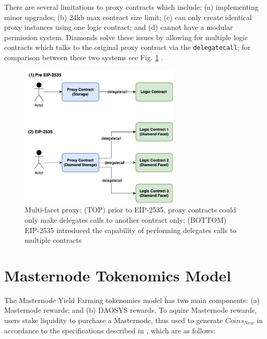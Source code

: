 \documentclass[journal,twocolumn,12pt]{ieeesyscoin}
\begin{document}
There are several limitations to proxy contracts which include: (a) implementing minor upgrades; (b) 24kb max contract size limit; (c) can only create identical proxy instances using one logic contract; and (d) cannot have a modular permission system. Diamonds solve these issues by allowing for multiple logic contracts which talks to the original proxy contract via the \texttt{delegatecall}; for comparison between these two systems see Fig. \ref{fig:diamonds} .

\begin{figure}[h!]
\includegraphics[width=3in]{img/diamonds.png}
\caption{Multi-facet proxy; (TOP) prior to EIP-2535, proxy contracts could only make delegates calls to another contract only; (BOTTOM) EIP-2535 introduced the capability of performing delegates calls to multiple contracts} 
\label{fig:diamonds}
\end{figure} 

\section{Masternode Tokenomics Model}
\label{sec:masternode_tokenomics}

The Masternode Yield Farming tokenomics model has two main components: (a) Masternode rewards; and (b) DAOSYS rewards. To aquire Masternode rewards, users stake liquidity to purchase a Masternode, thus used to generate $Coins_{New}$ in accordance to the specifications described in \cite{Sig21b}, which are as follows:
\end{document}

